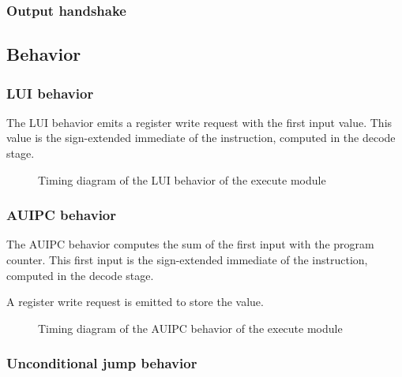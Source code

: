     \subsubsection{Output handshake}

  \subsection{Behavior}

    \subsubsection{LUI behavior}

      \begin{content}
          The LUI behavior emits a register write request with the first input value. This value is the sign-extended immediate of the instruction, computed in the decode stage.
        \end{content}

      \begin{figure}[H]
          \centering
          
          \caption{Timing diagram of the LUI behavior of the execute module}
          \label{fig:exm-behavior-lui}
        \end{figure}

    \subsubsection{AUIPC behavior}

      \begin{content}
          The AUIPC behavior computes the sum of the first input with the program counter. This first input is the sign-extended immediate of the instruction, computed in the decode stage.
          
          A register write request is emitted to store the value.
        \end{content}

      \begin{figure}[H]
          \centering
          
          \caption{Timing diagram of the AUIPC behavior of the execute module}
          \label{fig:exm-behavior-auipc}
        \end{figure}

    \subsubsection{Unconditional jump behavior}

